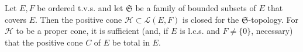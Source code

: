 Let $E, F$ be ordered t.v.s. and let $\mathfrak{S}$ be a family of bounded subsets of $E$ that covers $E$. Then the positive cone $\mathcal{H} \subset \mathcal{L}(E, F)$ is closed for the $\mathfrak{S}$-topology. For $\mathcal{H}$ to be a proper cone, it is sufficient (and, if $E$ is l.c.s. and $F \neq \{0\}$, necessary) that the positive cone $C$ of $E$ be total in $E$.
